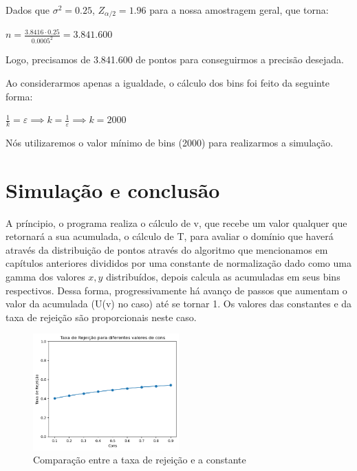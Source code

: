 \documentclass[a4paper]{article}
\begin{document}
Dados que $\sigma^2 = 0.25$, $Z_{\alpha/2} = 1.96$ para a nossa amostragem geral, que torna:

\begin{center}
    

$n = \frac{3.8416 \cdot 0.25}{0.0005^2} = 3.841.600$

\end{center} 

Logo, precisamos de 3.841.600 de pontos para conseguirmos a precisão desejada.

Ao considerarmos apenas a igualdade, o cálculo dos bins foi feito da seguinte forma:

\begin{center}
    

$\frac{1}{k} = \varepsilon \implies k = \frac{1}{\varepsilon} \implies k = 2000$

\end{center} 

Nós utilizaremos o valor mínimo de bins (2000) para realizarmos a simulação.

\section{Simulação e conclusão}

A príncipio, o programa realiza o cálculo de v, que recebe um valor qualquer que retornará a sua acumulada, o cálculo de T, para avaliar o domínio que haverá através da distribuição de pontos através do algoritmo que mencionamos em capítulos anteriores divididos por uma constante de normalização dado como uma gamma dos valores $x, y$ distribuídos, depois calcula as acumuladas em seus bins respectivos. Dessa forma, progressivamente há avanço de passos que aumentam o valor da acumulada (U(v) no caso) até se tornar 1. Os valores das constantes e da taxa de rejeição são proporcionais neste caso.

\begin{figure}[H]
  \centering
  \includegraphics[width=0.5\textwidth]{Reject.png}
  \caption{Comparação entre a taxa de rejeição e a constante \lambda}
  \label{fig:HxU}
\end{figure}
\end{document}
